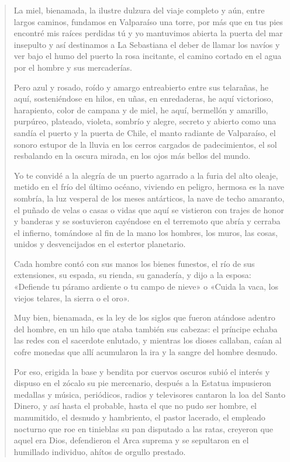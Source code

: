 \documentclass[12pt]{article}
\begin{document}
\begin{verse}
La miel, bienamada, la ilustre dulzura del viaje completo  
y aún, entre largos caminos, fundamos en Valparaíso una torre,  
por más que en tus pies encontré mis raíces perdidas  
tú y yo mantuvimos abierta la puerta del mar insepulto  
y así destinamos a La Sebastiana el deber de llamar los navíos  
y ver bajo el humo del puerto la rosa incitante,  
el camino cortado en el agua por el hombre y sus mercaderías.  

Pero azul y rosado, roído y amargo entreabierto entre sus telarañas,  
he aquí, sosteniéndose en hilos, en uñas, en enredaderas,  
he aquí victorioso, harapiento, color de campana y de miel,  
he aquí, bermellón y amarillo, purpúreo, plateado, violeta,  
sombrío y alegre, secreto y abierto como una sandía  
el puerto y la puerta de Chile, el manto radiante de Valparaíso,  
el sonoro estupor de la lluvia en los cerros cargados de padecimientos,  
el sol resbalando en la oscura mirada, en los ojos más bellos del mundo.  

Yo te convidé a la alegría de un puerto agarrado a la furia del alto oleaje,  
metido en el frío del último océano, viviendo en peligro,  
hermosa es la nave sombría, la luz vesperal de los meses antárticos,  
la nave de techo amaranto, el puñado de velas o casas o vidas  
que aquí se vistieron con trajes de honor y banderas  
y se sostuvieron cayéndose en el terremoto que abría y cerraba el infierno,  
tomándose al fin de la mano los hombres, los muros, las cosas,  
unidos y desvencijados en el estertor planetario.  

Cada hombre contó con sus manos los bienes funestos, el río  
de sus extensiones, su espada, su rienda, su ganadería,  
y dijo a la esposa: «Defiende tu páramo ardiente o tu campo de nieve»  
o «Cuida la vaca, los viejos telares, la sierra o el oro».  

Muy bien, bienamada, es la ley de los siglos que fueron atándose  
adentro del hombre, en un hilo que ataba también sus cabezas:  
el príncipe echaba las redes con el sacerdote enlutado,  
y mientras los dioses callaban, caían al cofre monedas  
que allí acumularon la ira y la sangre del hombre desnudo.  

Por eso, erigida la base y bendita por cuervos oscuros  
subió el interés y dispuso en el zócalo su pie mercenario,  
después a la Estatua impusieron medallas y música,  
periódicos, radios y televisores cantaron la loa del Santo Dinero,  
y así hasta el probable, hasta el que no pudo ser hombre,  
el manumitido, el desnudo y hambriento, el pastor lacerado,  
el empleado nocturno que roe en tinieblas su pan disputado a las ratas,  
creyeron que aquel era Dios, defendieron el Arca suprema  
y se sepultaron en el humillado individuo, ahítos de orgullo prestado.  

\end{verse}
\end{document}
